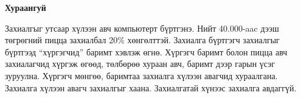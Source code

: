 

\begin{center}
{\scshape\Large \univname\par} %
{\scshape\large \facname\par}\vspace{0.5cm} %
{\huge\textbf{{Хураангуй}} \par}
\bigskip
{\Large{\ttitle} \par} %
\bigskip

{\normalsize \shortname \par} %
\addressname
\end{center}

\qquad
Захиалгыг утсаар хүлээн авч компьютерт бүртгэнэ. Нийт 40.000-aac дээш төгрөгний пицца захиалбал 20\% хөнгөлттэй. Захиалга бүртгэгч захиалгыг бүртгээд “хүргэгчид” баримт хэвлэж өгнө. Хүргэгч баримт болон пицца авч захиалагчид хүргэж өгөөд, төлбөрөө хураан авч, баримт дээр гарын үсэг зуруулна. Хүргэгч мөнгөө, баримтаа захиалга хүлээн авагчид хураалгана. Захиалга хүлээн авагч захиалгыг хаана. Захиалгатай хүнээс захиалга авдаггүй.